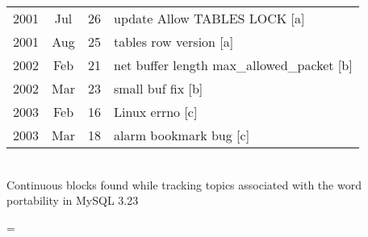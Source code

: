 \documentclass[titlepage,usenames,a4,landscape,semhelv]{seminar}
\begin{document}
\begin{slide}
\begin{specquotef}
\begin{tabular}{|ccc|l|}
\hline
2001 &  Jul &  26 &    update Allow TABLES LOCK [a] \\ 

2001 &  Aug &  25 &    tables row version [a] \\
\hline
\hline
2002 &  Feb &  21 &    net buffer length  max\_allowed\_packet [b] \\
2002 &  Mar &  23 &    small buf fix [b]  \\
\hline
\hline
2003 &  Feb &  16 &    Linux errno  [c] \\
2003 &  Mar &  18 &    alarm bookmark bug [c] \\
\hline
\end{tabular} \\
{Continuous blocks found while tracking topics associated with the word portability in MySQL 3.23}
\label{tab:portability}
\end{specquotef}

\newslide



=
\end{slide}
\end{document}
